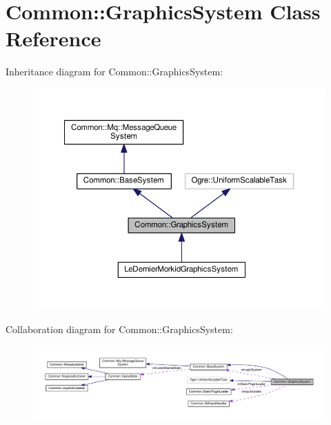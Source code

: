 \hypertarget{class_common_1_1_graphics_system}{}\section{Common\+:\+:Graphics\+System Class Reference}
\label{class_common_1_1_graphics_system}


Inheritance diagram for Common\+:\+:Graphics\+System\+:\nopagebreak
\begin{figure}[H]
\begin{center}
\leavevmode
\includegraphics[width=350pt]{class_common_1_1_graphics_system__inherit__graph}
\end{center}
\end{figure}


Collaboration diagram for Common\+:\+:Graphics\+System\+:\nopagebreak
\begin{figure}[H]
\begin{center}
\leavevmode
\includegraphics[width=350pt]{class_common_1_1_graphics_system__coll__graph}
\end{center}
\end{figure}
